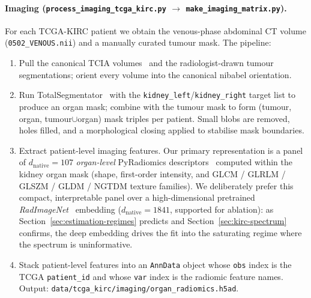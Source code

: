 \documentclass{article}
\begin{document}
\paragraph{Imaging
(\texttt{process\_imaging\_tcga\_kirc.py} $\to$ \texttt{make\_imaging\_matrix.py}).}
For each TCGA-KIRC patient we obtain the venous-phase abdominal CT volume
(\texttt{0502\_VENOUS.nii}) and a manually curated tumour mask. The pipeline:
\begin{enumerate}
\item Pull the canonical TCIA volumes~\citep{clark2013tcia,tcgakirc_tcia} and the
radiologist-drawn tumour
segmentations; orient every volume into the canonical
nibabel orientation.
\item Run TotalSegmentator~\citep{wasserthal2023totalsegmentator} with the
\texttt{kidney\_left}/\texttt{kidney\_right} target list to produce an organ
mask; combine with the tumour mask to form (tumour, organ, tumour$\cup$organ)
mask triples per patient. Small blobs are removed, holes filled, and a
morphological closing applied to stabilise mask boundaries.
\item Extract patient-level imaging features. Our primary representation is a
panel of $d_{\mathrm{native}} = 107$ \emph{organ-level} PyRadiomics
descriptors~\citep{vangriethuysen2017pyradiomics,aerts2014radiomics} computed
within the kidney organ mask (shape, first-order intensity, and GLCM / GLRLM /
GLSZM / GLDM / NGTDM texture families). We deliberately prefer this compact,
interpretable panel over a high-dimensional pretrained
\emph{RadImageNet}~\citep{mei2022radimagenet} embedding
($d_{\mathrm{native}}=1841$, supported for ablation): as
Section~\ref{sec:estimation-regimes} predicts and
Section~\ref{sec:kirc-spectrum} confirms, the deep embedding drives the fit
into the saturating regime where the spectrum is uninformative.
\item Stack patient-level features into an \texttt{AnnData} object whose
\texttt{obs} index is the TCGA \texttt{patient\_id} and whose \texttt{var}
index is the radiomic feature names. Output:
\texttt{data/tcga\_kirc/imaging/organ\_radiomics.h5ad}.
\end{enumerate}
\end{document}
